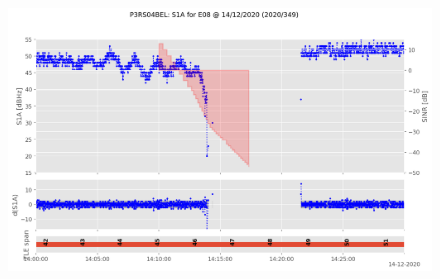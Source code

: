 \begin{enumerate}
\begin{figure}[H]%
\centering%
\includegraphics[width=0.95\linewidth]{png/P3RS04BEL_R_20203490000_01D_00U_MO_E-S1A-E08.png}%
\end{figure}


\end{enumerate}
